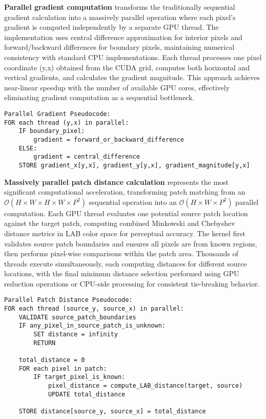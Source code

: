 \documentclass[11pt]{article}
\begin{document}
\textbf{Parallel gradient computation} transforms the traditionally sequential gradient calculation into a massively parallel operation where each pixel's gradient is computed independently by a separate GPU thread. The implementation uses central difference approximation for interior pixels and forward/backward differences for boundary pixels, maintaining numerical consistency with standard CPU implementations. Each thread processes one pixel coordinate (y,x) obtained from the CUDA grid, computes both horizontal and vertical gradients, and calculates the gradient magnitude. This approach achieves near-linear speedup with the number of available GPU cores, effectively eliminating gradient computation as a sequential bottleneck.

\begin{verbatim}
Parallel Gradient Pseudocode:
FOR each thread (y,x) in parallel:
    IF boundary_pixel:
        gradient = forward_or_backward_difference
    ELSE:
        gradient = central_difference
    STORE gradient_x[y,x], gradient_y[y,x], gradient_magnitude[y,x]
\end{verbatim}

\textbf{Massively parallel patch distance calculation} represents the most significant computational acceleration, transforming patch matching from an $\mathcal{O}(H \times W \times H \times W \times P^2)$ sequential operation into an $\mathcal{O}(H \times W \times P^2)$ parallel computation. Each GPU thread evaluates one potential source patch location against the target patch, computing combined Minkowski and Chebyshev distance metrics in LAB color space for perceptual accuracy. The kernel first validates source patch boundaries and ensures all pixels are from known regions, then performs pixel-wise comparisons within the patch area. Thousands of threads execute simultaneously, each computing distances for different source locations, with the final minimum distance selection performed using GPU reduction operations or CPU-side processing for consistent tie-breaking behavior.

\begin{verbatim}
Parallel Patch Distance Pseudocode:
FOR each thread (source_y, source_x) in parallel:
    VALIDATE source_patch_boundaries
    IF any_pixel_in_source_patch_is_unknown:
        SET distance = infinity
        RETURN
    
    total_distance = 0
    FOR each pixel in patch:
        IF target_pixel_is_known:
            pixel_distance = compute_LAB_distance(target, source)
            UPDATE total_distance
    
    STORE distance[source_y, source_x] = total_distance
\end{verbatim}
\end{document}
